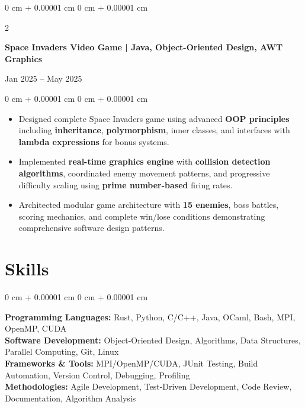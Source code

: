 \documentclass[10pt, letterpaper]{article}
\newenvironment{highlights}{
    \begin{itemize}[
        topsep=0.05 cm,
        parsep=0.05 cm,
        partopsep=0pt,
        itemsep=0pt,
        leftmargin=0 cm + 10pt
    ]
}{
    \end{itemize}
}
\newenvironment{onecolentry}{
    \begin{adjustwidth}{
        0 cm + 0.00001 cm
    }{
        0 cm + 0.00001 cm
    }
}{
    \end{adjustwidth}
}
\newenvironment{twocolentry}[2][]{
    \onecolentry
    \def\secondColumn{#2}
    \setcolumnwidth{\fill, 4.5 cm}
    \begin{paracol}{2}
}{
    \switchcolumn \raggedleft \secondColumn
    \end{paracol}
    \endonecolentry
}
\begin{document}
        \vspace{0.10 cm}

        \vspace{0.10 cm}
        \begin{twocolentry}{
            Jan 2025 – May 2025
        }
            \textbf{Space Invaders Video Game | \textbf{Java}, Object-Oriented Design, AWT Graphics}
        \end{twocolentry}
        \vspace{0.05 cm}
        \begin{onecolentry}
            \begin{highlights}
                \item Designed complete Space Invaders game using advanced \textbf{OOP principles} including \textbf{inheritance}, \textbf{polymorphism}, inner classes, and interfaces with \textbf{lambda expressions} for bonus systems.
                \item Implemented \textbf{real-time graphics engine} with \textbf{collision detection algorithms}, coordinated enemy movement patterns, and progressive difficulty scaling using \textbf{prime number-based} firing rates.
                \item Architected modular game architecture with \textbf{15 enemies}, boss battles, scoring mechanics, and complete win/lose conditions demonstrating comprehensive software design patterns.
            \end{highlights}
        \end{onecolentry}

    \section{Skills}
        \begin{onecolentry}
            \textbf{Programming Languages:} Rust, Python, C/C++, Java, OCaml, Bash, MPI, OpenMP, CUDA \\
            \textbf{Software Development:} Object-Oriented Design, Algorithms, Data Structures, Parallel Computing, Git, Linux \\
            \textbf{Frameworks \& Tools:} MPI/OpenMP/CUDA, JUnit Testing, Build Automation, Version Control, Debugging, Profiling \\
            \textbf{Methodologies:} Agile Development, Test-Driven Development, Code Review, Documentation, Algorithm Analysis
        \end{onecolentry}
\end{document}
